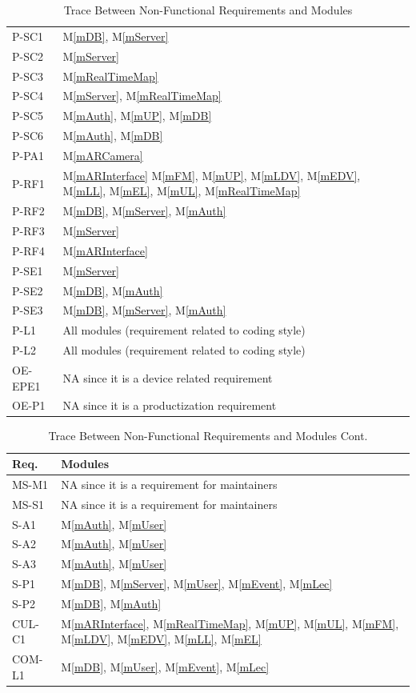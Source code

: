 \documentclass[12pt, titlepage]{article}
\newcommand{\mref}[1]{M\ref{#1}}
\begin{document}
\begin{table}[H]
\begin{tabular}{p{} p{}}
P-SC1 & \mref{mDB}, \mref{mServer}\\
P-SC2 & \mref{mServer}\\
P-SC3 & \mref{mRealTimeMap}\\
P-SC4 & \mref{mServer}, \mref{mRealTimeMap}\\
P-SC5 & \mref{mAuth}, \mref{mUP}, \mref{mDB}\\
P-SC6 & \mref{mAuth}, \mref{mDB}\\
P-PA1 & \mref{mARCamera}\\
P-RF1 & \mref{mARInterface} \mref{mFM}, \mref{mUP}, \mref{mLDV}, \mref{mEDV}, \mref{mLL}, \mref{mEL}, \mref{mUL}, \mref{mRealTimeMap}\\
P-RF2 & \mref{mDB}, \mref{mServer}, \mref{mAuth}\\
P-RF3 & \mref{mServer}\\
P-RF4 & \mref{mARInterface}\\
P-SE1 & \mref{mServer}\\
P-SE2 & \mref{mDB}, \mref{mAuth}\\
P-SE3 & \mref{mDB}, \mref{mServer}, \mref{mAuth}\\
P-L1 & All modules (requirement related to coding style)\\
P-L2 & All modules (requirement related to coding style)\\
OE-EPE1 & NA since it is a device related requirement\\
OE-P1 & NA since it is a productization requirement\\
\bottomrule
\end{tabular}
\caption{Trace Between Non-Functional Requirements and Modules}
\label{TblNFRT}
\end{table}

\begin{table}[H]
\centering
\begin{tabular}{p{} p{}}
\toprule
\textbf{Req.} & \textbf{Modules}\\
\midrule
MS-M1 & NA since it is a requirement for maintainers\\
MS-S1 & NA since it is a requirement for maintainers\\
S-A1 & \mref{mAuth}, \mref{mUser}\\
S-A2 & \mref{mAuth}, \mref{mUser}\\
S-A3 & \mref{mAuth}, \mref{mUser}\\
S-P1 & \mref{mDB}, \mref{mServer}, \mref{mUser}, \mref{mEvent}, \mref{mLec}\\
S-P2 & \mref{mDB}, \mref{mAuth}\\
CUL-C1 & \mref{mARInterface}, \mref{mRealTimeMap}, \mref{mUP}, \mref{mUL}, \mref{mFM}, \mref{mLDV}, \mref{mEDV}, \mref{mLL}, \mref{mEL}\\
COM-L1 & \mref{mDB}, \mref{mUser}, \mref{mEvent}, \mref{mLec}\\
\bottomrule
\end{tabular}
\caption{Trace Between Non-Functional Requirements and Modules Cont.}
\label{TblNFRT-CONT}
\end{table}
\end{document}
